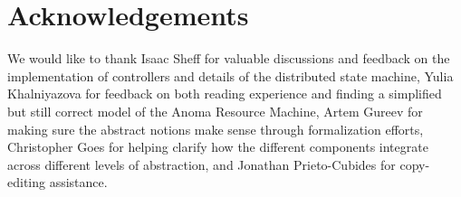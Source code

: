 \section{Acknowledgements}


We would like to thank Isaac Sheff for valuable discussions and feedback on the implementation of controllers and details of the distributed state machine, Yulia Khalniyazova for feedback on both reading experience and finding a simplified but still correct model of the Anoma Resource Machine, Artem Gureev for making sure the abstract notions make sense through formalization efforts, Christopher Goes for helping clarify how the different components integrate across different levels of abstraction, and Jonathan Prieto-Cubides for copy-editing assistance.